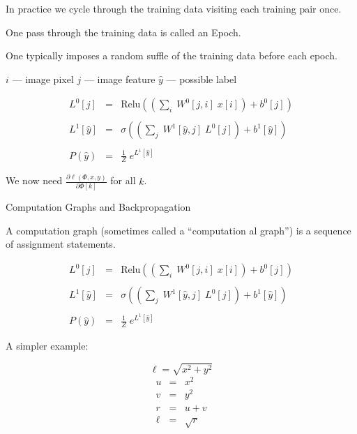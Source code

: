 {

In practice we cycle through the training data visiting each training pair once.

\vfill
One pass through the training data is called an Epoch.

\vfill
One typically imposes a random suffle of the training data before each epoch.


\centerline{$i$ --- image pixel \hspace{4ex} $j$ --- image feature \hspace{4ex} $\hat{y}$ --- possible label}

\vfill
\begin{eqnarray*}
  L^0[j] & = & \mathrm{Relu}\left(\left(\sum_i\;W^0[j,i] \;x[i]\right) + b^0[j]\right) \\
  \\
  L^1[\hat{y}] & = & \sigma\left(\left(\sum_j\;W^1[\hat{y},j]\;L^0[j]\right) + b^1[\hat{y}]\right) \\
  \\
  P(\hat{y}) & = & \frac{1}{Z} \;e^{L^1[\hat{y}]}
\end{eqnarray*}

\vfill
We now need $\frac{\partial \ell(\Phi,x,y)}{\partial \Phi[k]}$ for all $k$.

\slide{}

\centerline{Computation Graphs and Backpropagation}

\vfill


A computation graph (sometimes called a ``computation{\color{red} al} graph'') is a sequence of assignment statements.


\vfill
\begin{eqnarray*}
  L^0[j] & = & \mathrm{Relu}\left(\left(\sum_i\;W^0[j,i] \;x[i]\right) + b^0[j]\right) \\
  \\
  L^1[\hat{y}] & = & \sigma\left(\left(\sum_j\;W^1[\hat{y},j]\;L^0[j]\right) + b^1[\hat{y}]\right) \\
  \\
  P(\hat{y}) & = & \frac{1}{Z} \;e^{L^1[\hat{y}]}
\end{eqnarray*}

A simpler example:

\vfill
$$\ell = \sqrt{x^2 + y^2}$$
\begin{eqnarray*}
  u & = & x^2  \\
  v & = & y^2 \\
  r & =& u + v \\
  \ell & = & \sqrt{r}
\end{eqnarray*}

}
